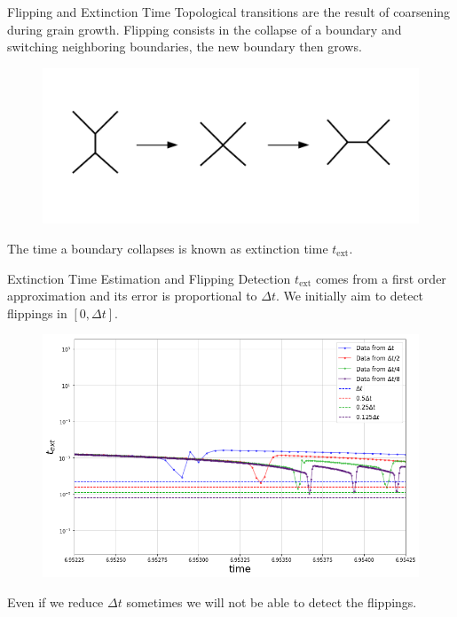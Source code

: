 \documentclass[usenames,dvipsnames]{beamer}
\begin{document}
\begin{frame}{Flipping and Extinction Time}
Topological transitions are the result of coarsening during grain growth. Flipping consists in the collapse of a boundary and switching neighboring boundaries, the new boundary then grows.
\begin{figure}
    \centering
    \includegraphics[scale=0.5]{figures/coupled_model/flipping.pdf}
\end{figure}
The time a boundary collapses is known as extinction time $t_\text{ext}$.
\end{frame}


\begin{frame}{Extinction Time Estimation and Flipping Detection}
$t_{\text{ext}}$ comes from a first order approximation and its error is proportional to $\Delta t$. We initially aim to detect flippings in $[0,\Delta t]$.
\begin{figure}
    \centering
    \includegraphics[scale=0.3]{figures/coupled_model/image_preview.png}
\end{figure}
Even if we reduce $\Delta t$ sometimes we will not be able to detect the flippings.
\end{frame}
\end{document}
